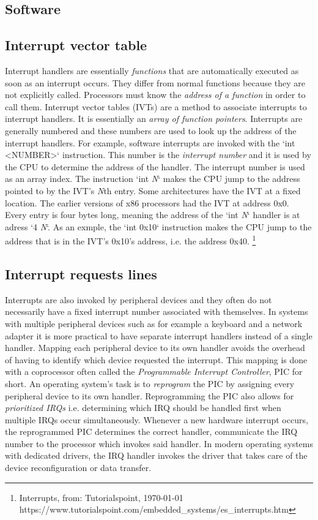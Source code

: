 \subsection{Software}

\subsection{Interrupt vector table}

Interrupt handlers are essentially \textit{functions} that are automatically executed as soon as an
interrupt occurs. They differ from normal functions because they are not explicitly called.
Processors must know the \textit{address of a function} in order to call them. Interrupt vector
tables (IVTs) are a method to associate interrupts to interrupt handlers. It is essentially an
\textit{array of function pointers}. Interrupts are generally numbered and these numbers are used to look up 
the address of the interrupt handlers. For example, software interrupts are invoked with the `int 
\textless NUMBER\textgreater` instruction. This number is the \textit{interrupt number} and it is used by the CPU to determine 
the address of the handler. The interrupt number is used as an array index. The instruction `int \textit{N}` 
makes the CPU jump to the address pointed to by the IVT's \textit{N}th entry. Some architectures have the IVT
at a fixed location. The earlier versions of x86 processors had the IVT at address 0x0. Every entry
is four bytes long, meaning the address of the `int \textit{N}` handler is at adress `4 \* \textit{N}`. As an exmple,
the `int 0x10` instruction makes the CPU jump to the address that is in the IVT's 0x10's address,
i.e. the address 0x40. \footnote{Interrupts, from: Tutorialspoint, \today  \\ https://www.tutorialspoint.com/embedded\_systems/es\_interrupts.htm}

\subsection{Interrupt requests lines}

Interrupts are also invoked by peripheral devices and they often do not necessarily have a fixed 
interrupt number associated with themselves. In systems with multiple peripheral devices such as for 
example a keyboard and a network adapter it is more practical to have separate interrupt handlers
instead of a single handler. Mapping each peripheral device to its own handler avoids the overhead of 
having to identify which device requested the interrupt. This mapping is done with a coprocessor often
called the \textit{Programmable Interrupt Controller}, PIC for short. An operating system's task is to
\textit{reprogram} the PIC by assigning every peripheral device to its own handler. Reprogramming the PIC also
allows for \textit{prioritized IRQs} i.e. determining which IRQ should be handled first when multiple IRQs 
occur simultaneously. Whenever a new hardware interrupt occurs, the reprogrammed PIC determines
the correct handler, communicate the IRQ number to the processor which invokes said handler. In
modern operating systems with dedicated drivers, the IRQ handler invokes the driver that takes
care of the device reconfiguration or data transfer.
